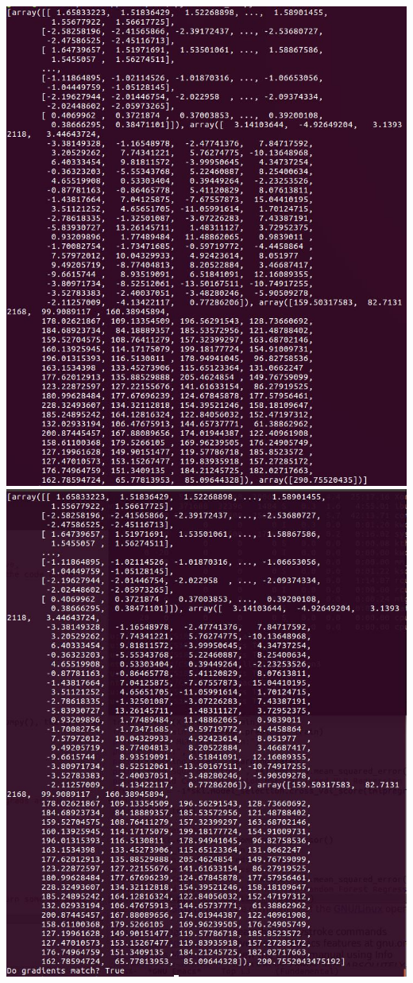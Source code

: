 \documentclass[submit]{harvardml}
\begin{document}
\begin{enumerate}
\begin{center}
    \end{center}  \includegraphics[scale=.50]{hw3/Pics/Capture3.JPG}
    \includegraphics[scale=.50]{hw3/Pics/Capture2.JPG}

\end{enumerate}
\end{document}
